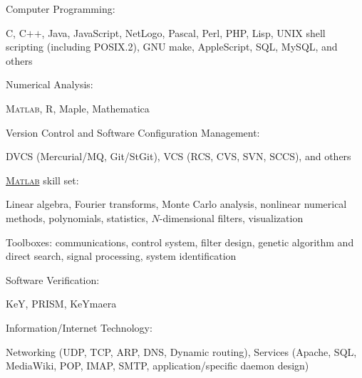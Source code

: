 \documentclass[10pt]{article}
\newcommand{\halfblankline}{\quad\vspace{-0.5\baselineskip}\pagebreak[3]}
\providecommand\Matlab{\textsc{Matlab}}
\begin{document}
\halfblankline

Computer Programming:
%
\begin{innerlist}
    \item C, C$+$$+$, Java, JavaScript, NetLogo, Pascal, Perl, PHP,
        Lisp, UNIX shell scripting (including POSIX.2), GNU make,
        AppleScript, SQL, MySQL, and others
\end{innerlist}

\halfblankline

Numerical Analysis:
%
\begin{innerlist}
    \item \Matlab, R, Maple, Mathematica
\end{innerlist}

\halfblankline

Version Control and Software Configuration Management:
%
\begin{innerlist}
    \item DVCS (Mercurial/MQ, Git/StGit), VCS (RCS, CVS, SVN, SCCS), and
        others
\end{innerlist}

\halfblankline

\href{http://www.mathworks.com/products/matlab/}{\Matlab} skill set:
%
\begin{innerlist}
    \item Linear algebra, Fourier transforms, Monte Carlo analysis,
        nonlinear numerical methods, polynomials, statistics,
        $N$-dimensional filters, visualization

    \item Toolboxes: communications, control system, filter design,
        genetic algorithm and direct search, signal processing, system
        identification
\end{innerlist}

\halfblankline

Software Verification:
%
\begin{innerlist}
    \item KeY, PRISM, KeYmaera
\end{innerlist}

\halfblankline

Information/Internet Technology:
%
\begin{innerlist}
    \item Networking (UDP, TCP, ARP, DNS, Dynamic
        routing), Services (Apache, SQL, MediaWiki, POP, IMAP, SMTP,
        application\-/specific daemon design)
\end{innerlist}
\end{document}
